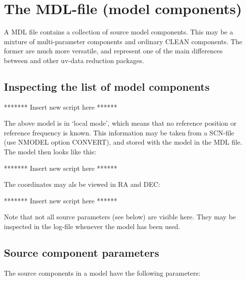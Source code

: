 %
%
\chapter{The MDL-file (model components)}
\tableofcontents 

A \NEWSTAR MDL file contains a collection of source model components.
This may be a mixture of multi-parameter components and ordinary CLEAN
components. The former are much more versatile, and represent one of the
main differences between \NEWSTAR and other uv-data reduction packages.


\section{Inspecting the list of model components}
\label{mdl.descr.example}


******* Insert new script here ******


The above model is in `local mode', which means that no reference position or
reference frequency is known. This information may be taken from a SCN-file
(use NMODEL option CONVERT), and stored with the model in the MDL file. The
model then looks like this: 


******* Insert new script here ******

\newpage
The coordinates may als be viewed in RA and DEC:


******* Insert new script here ******


Note that not all source parameters (see below) are visible here. They may
be inspected in the log-file whenever the model has been used.

\section{Source component parameters}
\label{mdl.descr.param}

The source components in a \NEWSTAR model have the following parameters:

